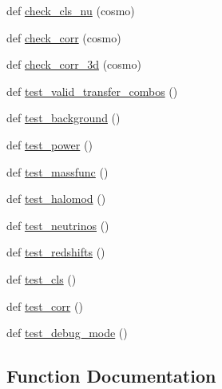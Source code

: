 \begin{DoxyCompactItemize}
\item 
def \mbox{\hyperlink{namespaceccl__test__pyccl__interface_a1e444dede41317aa26bcdc16c0eaeb53}{check\+\_\+cls\+\_\+nu}} (cosmo)
\item 
def \mbox{\hyperlink{namespaceccl__test__pyccl__interface_a3fae4f90be1642643dc2c746846a3e10}{check\+\_\+corr}} (cosmo)
\item 
def \mbox{\hyperlink{namespaceccl__test__pyccl__interface_a1ad832016b388d40507aac3844c14ec4}{check\+\_\+corr\+\_\+3d}} (cosmo)
\item 
def \mbox{\hyperlink{namespaceccl__test__pyccl__interface_a64e29dd68981ffe884100ab216146869}{test\+\_\+valid\+\_\+transfer\+\_\+combos}} ()
\item 
def \mbox{\hyperlink{namespaceccl__test__pyccl__interface_ac8e0f5304f7823f08dd48bd16736cbde}{test\+\_\+background}} ()
\item 
def \mbox{\hyperlink{namespaceccl__test__pyccl__interface_aa0fa1e5e5f099cfa4e0c55e8cc80f585}{test\+\_\+power}} ()
\item 
def \mbox{\hyperlink{namespaceccl__test__pyccl__interface_a7aa32506e6319a810450e886106d3207}{test\+\_\+massfunc}} ()
\item 
def \mbox{\hyperlink{namespaceccl__test__pyccl__interface_a1936b759676e55f5a5c9a339af0bba48}{test\+\_\+halomod}} ()
\item 
def \mbox{\hyperlink{namespaceccl__test__pyccl__interface_ae4c580c07c1b1ff62524d160ea8d6756}{test\+\_\+neutrinos}} ()
\item 
def \mbox{\hyperlink{namespaceccl__test__pyccl__interface_a98c145b0ae8ed38c073dbd8ba7c3718a}{test\+\_\+redshifts}} ()
\item 
def \mbox{\hyperlink{namespaceccl__test__pyccl__interface_af43480922699de3f04ac202305e22666}{test\+\_\+cls}} ()
\item 
def \mbox{\hyperlink{namespaceccl__test__pyccl__interface_ac7244d534c03943f2b622f66d8b5e431}{test\+\_\+corr}} ()
\item 
def \mbox{\hyperlink{namespaceccl__test__pyccl__interface_aefa58335e41682f374a241db87d26278}{test\+\_\+debug\+\_\+mode}} ()
\end{DoxyCompactItemize}


\subsection{Function Documentation}
\mbox{\label{namespaceccl__test__pyccl__interface_aecd07d8c3c95bccf7dad21e068684ad0}} 
